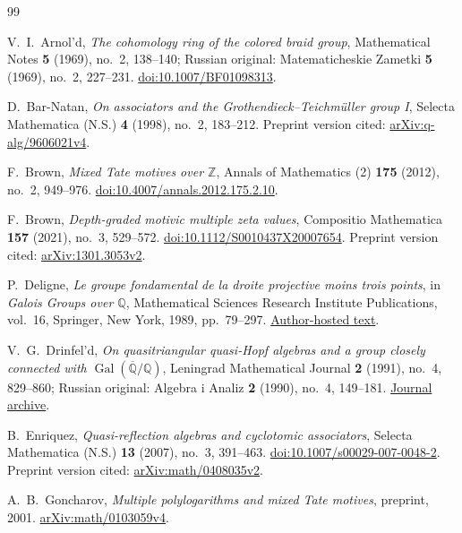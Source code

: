 \begin{thebibliography}{99}

V.~I.~Arnol'd,
\emph{The cohomology ring of the colored braid group},
Mathematical Notes \textbf{5} (1969), no.~2, 138--140;
Russian original: Matematicheskie Zametki \textbf{5} (1969), no.~2, 227--231.
\href{https://doi.org/10.1007/BF01098313}{doi:10.1007/BF01098313}.

D.~Bar-Natan,
\emph{On associators and the Grothendieck--Teichm\"uller group I},
Selecta Mathematica (N.S.) \textbf{4} (1998), no.~2, 183--212.
Preprint version cited:
\href{https://arxiv.org/abs/q-alg/9606021v4}{arXiv:q-alg/9606021v4}.

F.~Brown,
\emph{Mixed Tate motives over \(\mathbb{Z}\)},
Annals of Mathematics (2) \textbf{175} (2012), no.~2, 949--976.
\href{https://doi.org/10.4007/annals.2012.175.2.10}{doi:10.4007/annals.2012.175.2.10}.

F.~Brown,
\emph{Depth-graded motivic multiple zeta values},
Compositio Mathematica \textbf{157} (2021), no.~3, 529--572.
\href{https://doi.org/10.1112/S0010437X20007654}{doi:10.1112/S0010437X20007654}.
Preprint version cited:
\href{https://arxiv.org/abs/1301.3053v2}{arXiv:1301.3053v2}.

P.~Deligne,
\emph{Le groupe fondamental de la droite projective moins trois points},
in \emph{Galois Groups over \(\mathbb Q\)},
Mathematical Sciences Research Institute Publications, vol.~16,
Springer, New York, 1989, pp.~79--297.
\href{https://publications.ias.edu/sites/default/files/61_LeGroupeFondamentalDroite.pdf}{Author-hosted text}.

V.~G.~Drinfel'd,
\emph{On quasitriangular quasi-Hopf algebras and a group closely
connected with \(\operatorname{Gal}(\overline{\mathbb{Q}}/\mathbb{Q})\)},
Leningrad Mathematical Journal \textbf{2} (1991), no.~4, 829--860;
Russian original: Algebra i Analiz \textbf{2} (1990), no.~4, 149--181.
\href{https://www.mathnet.ru/eng/aa199}{Journal archive}.

B.~Enriquez,
\emph{Quasi-reflection algebras and cyclotomic associators},
Selecta Mathematica (N.S.) \textbf{13} (2007), no.~3, 391--463.
\href{https://doi.org/10.1007/s00029-007-0048-2}{doi:10.1007/s00029-007-0048-2}.
Preprint version cited:
\href{https://arxiv.org/abs/math/0408035v2}{arXiv:math/0408035v2}.

A.~B.~Goncharov,
\emph{Multiple polylogarithms and mixed Tate motives},
preprint, 2001.
\newline
\href{https://arxiv.org/abs/math/0103059v4}{arXiv:math/0103059v4}.


\end{thebibliography}
